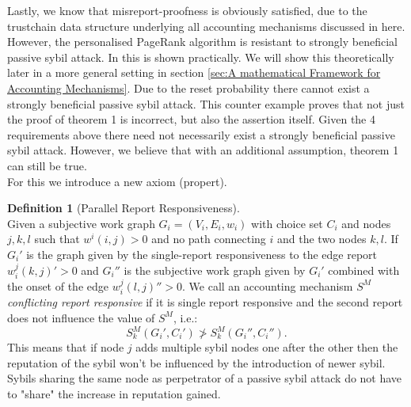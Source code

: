 \documentclass[11pt,a4paper]{article}
\theoremstyle{definition}
\newtheorem{definition}{Definition}[section]
\theoremstyle{theorem}
\theoremstyle{proposition}
\theoremstyle{corollary}
\theoremstyle{lemma}
\theoremstyle{example}
\theoremstyle{remark}
\begin{document}
\noindent{}Lastly, we know that misreport-proofness is obviously satisfied, due to the trustchain data structure underlying all accounting mechanisms discussed in here.\vspace{1em}\\

\noindent{}However, the personalised PageRank algorithm is resistant to strongly beneficial passive sybil attack. In \cite{A Random Walk Based Trust Ranking in Distributed Systems} this is shown practically. We will show this theoretically later in a more general setting in section \ref{sec:A mathematical Framework for Accounting Mechanisms}. Due to the reset probability there cannot exist a strongly beneficial passive sybil attack. This counter example proves that not just the proof of theorem 1 is incorrect, but also the assertion itself. Given the 4 requirements above there need not necessarily exist a strongly beneficial passive sybil attack. However, we believe that with an additional assumption, theorem 1 can still be true. \vspace{1em}\\

\noindent{}For this we introduce a new axiom (propert). \vspace{1em}\\

\begin{definition}[Parallel Report Responsiveness]\ \\
Given a subjective work graph $G_i=(V_i,E_i,w_i)$ with choice set $C_i$ and nodes $j,k,l$ such that $w^i(i,j)>0$ and no path connecting $i$ and the two nodes $k,l$. If $G_i'$ is the graph given by the single-report responsiveness to the edge report $w^j_i(k,j)'>0$ and $G_i''$ is the subjective work graph given by $G_i'$ combined with the onset of the edge $w^j_i(l,j)''>0$. We call an accounting mechanism $S^M$ {\it conflicting report responsive} if it is single report responsive and the second report does not influence the value of $S^M$, i.e.:
\[
S^M_k(G_i',C_i')\not>S^M_k(G_i'',C_i'').
\] 
This means that if node $j$ adds multiple sybil nodes one after the other then the reputation of the sybil won't be influenced by the introduction of newer sybil. Sybils sharing the same node as perpetrator of a passive sybil attack do not have to "share" the increase in reputation gained.
\end{definition}
\end{document}
